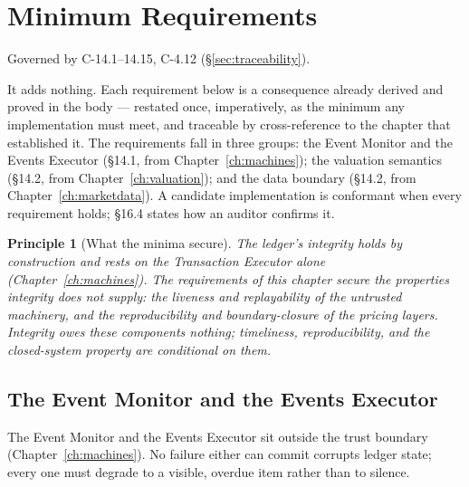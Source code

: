 \documentclass[11pt,a4paper]{article}
\newtheorem{principle}[definition]{Principle}
\begin{document}
\section{Minimum Requirements}\label{ch:requirements}

Governed by C-14.1--14.15, C-4.12 (\S\ref{sec:traceability}).

It adds nothing. Each requirement below is a consequence already derived and proved in
the body --- restated once, imperatively, as the minimum any implementation must meet, and
traceable by cross-reference to the chapter that established it. The requirements fall in
three groups: the Event Monitor and the Events Executor (\S 14.1, from
Chapter~\ref{ch:machines}); the valuation semantics (\S 14.2, from
Chapter~\ref{ch:valuation}); and the data boundary (\S 14.2, from
Chapter~\ref{ch:marketdata}). A candidate implementation is conformant when every
requirement holds; \S 16.4 states how an auditor confirms it.

\begin{principle}[What the minima secure]
The ledger's integrity holds by construction and rests on the Transaction Executor alone
(Chapter~\ref{ch:machines}). The requirements of this chapter secure the properties
integrity does \emph{not} supply: the liveness and replayability of the untrusted
machinery, and the reproducibility and boundary-closure of the pricing layers. Integrity
owes these components nothing; timeliness, reproducibility, and the closed-system property
are conditional on them.
\end{principle}

\subsection{The Event Monitor and the Events Executor}

The Event Monitor and the Events Executor sit outside the trust boundary
(Chapter~\ref{ch:machines}). No failure either can commit corrupts ledger state; every one
must degrade to a visible, overdue item rather than to silence.
\end{document}
